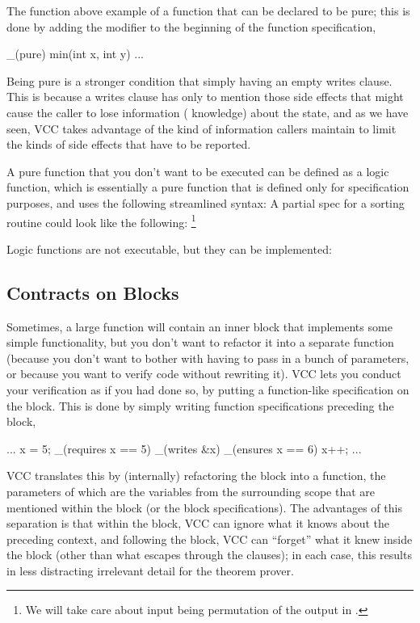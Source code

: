The function  above
example of a function that can be declared to be pure; this is done by
adding the modifier  to the beginning of the function specification,
\eg
\begin{VCC}
_(pure) min(int x, int y) ...
\end{VCC}

Being pure is a stronger condition that simply having an empty writes
clause. This is because a writes clause has only to mention those side
effects that might cause the caller to lose information (\ie
knowledge) about the state, and as we have seen, VCC takes advantage
of the kind of information callers maintain to limit the kinds of side
effects that have to be reported.

A pure function that you don't want to be executed can be defined as a
logic function, which is essentially a pure function that is defined
only for specification purposes, and uses the following streamlined syntax:
\noindent
A partial spec for a sorting routine could look like the following:%
\footnote{We will take care about input being permutation of the output in .}

Logic functions are not executable, but they can be implemented:


\subsection{Contracts on Blocks} 

Sometimes, a large function will contain an inner block that
implements some simple functionality, but you don't want to refactor
it into a separate function (\eg because you don't want to bother with
having to pass in a bunch of parameters, or because you want to verify
code without rewriting it). VCC lets you conduct your verification as
if you had done so, by putting a function-like specification on the
block.
This is done by simply writing function specifications
preceding the block, \eg
\begin{VCC}
...
x = 5;
_(requires x == 5)
_(writes &x)
_(ensures x == 6)
{
  x++;
}
...
\end{VCC}
VCC translates this by (internally) refactoring the block into a
function, the parameters of which are the variables from the
surrounding scope that are mentioned within the block (or the block
specifications). The advantages of this separation is that within the block,
VCC can ignore what it knows about the preceding context, and
following the block, VCC can ``forget'' what it knew inside the block
(other than what escapes through the  clauses); in each
case, this results in less distracting irrelevant detail for the
theorem prover.

